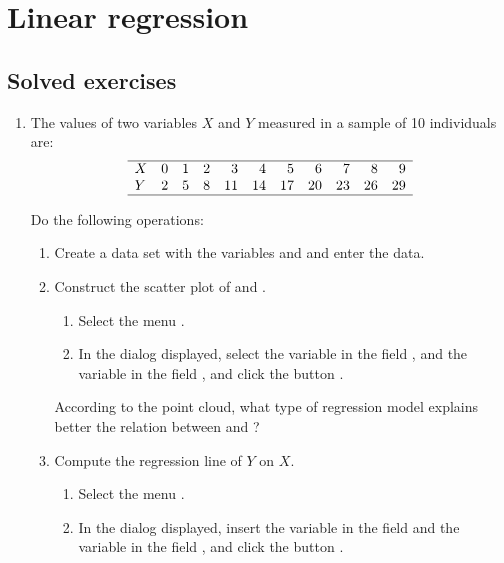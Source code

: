 
\chapter{Linear regression}\label{cha:linear-regression}

\section{Solved exercises}
\begin{enumerate}[leftmargin=*]
\item The values of two variables $X$ and $Y$ measured in a sample of 10 individuals are:
\[
\begin{array}{lrrrrrrrrrr}
\hline
X & 0 & 1 & 2 & 3 & 4 & 5 & 6 & 7 & 8 & 9 \\
Y & 2 & 5 & 8 & 11 & 14 & 17 & 20 & 23 & 26 & 29\\
\hline
\end{array}
\]

Do the following operations:

\begin{enumerate}
\item Create a data set with the variables  and  and enter the data.
\item Construct the scatter plot of  and .
\begin{indication}
\begin{enumerate}
\item Select the menu .
\item In the dialog displayed, select the variable  in the field , and the variable
 in the field , and click the button .
\end{enumerate}
\end{indication}

According to the point cloud, what type of regression model explains better the relation between  and
?

\item Compute the regression line of $Y$ on $X$.
\begin{indication}
\begin{enumerate}
\item Select the menu .
\item In the dialog displayed, insert the variable  in the field  and the variable
 in the field , and click the button .
\end{enumerate}
\end{indication}


\end{enumerate}
\end{enumerate}
